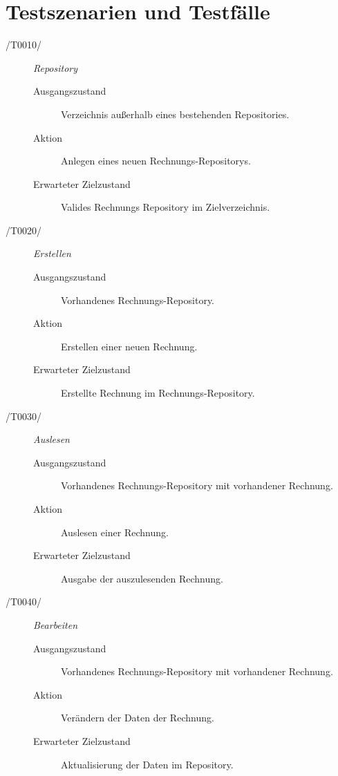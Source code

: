 
\section{Testszenarien und Testfälle}



\begin{description}
  \item[/T0010/]
	\textit{Repository}
	\begin{description}
		\item[Ausgangszustand]
		Verzeichnis außerhalb eines bestehenden Repositories.
		\item[Aktion]
		Anlegen eines neuen Rechnungs-Repositorys.
		\item[Erwarteter Zielzustand]
		Valides Rechnungs Repository im Zielverzeichnis.
	\end{description}

  \item[/T0020/]
	\textit{Erstellen}
	\begin{description}
		\item[Ausgangszustand]
		Vorhandenes Rechnungs-Repository.
		\item[Aktion]
		Erstellen einer neuen Rechnung.
		\item[Erwarteter Zielzustand]
		Erstellte Rechnung im Rechnungs-Repository.
	\end{description}

  \item[/T0030/]
	\textit{Auslesen}
	\begin{description}
		\item[Ausgangszustand]
		Vorhandenes Rechnungs-Repository mit vorhandener Rechnung.
		\item[Aktion]
		Auslesen einer Rechnung.
		\item[Erwarteter Zielzustand]
		Ausgabe der auszulesenden Rechnung.
	\end{description}

  \item[/T0040/]
	\textit{Bearbeiten}
	\begin{description}
		\item[Ausgangszustand]
		Vorhandenes Rechnungs-Repository mit vorhandener Rechnung.
		\item[Aktion]
		Verändern der Daten der Rechnung.
		\item[Erwarteter Zielzustand]
		Aktualisierung der Daten im Repository.
	\end{description}


\end{description}
